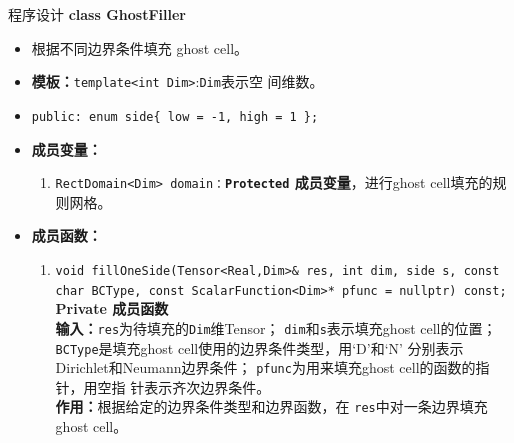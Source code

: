 \documentclass{beamer}
\begin{document}
\begin{frame}{程序设计}
  \textbf{\large class GhostFiller}
  \begin{itemize}
    \item 根据不同边界条件填充 ghost cell。
    \item \textbf{模板：}\texttt{template<int Dim>}:\texttt{Dim}表示空
      间维数。
    \item   \texttt{public: enum side\{
        low = -1,
        high = 1
        \};}
   \item \textbf{成员变量：}
        \begin{enumerate}[(1)]
            \item \texttt{RectDomain<Dim>
                domain：}\textbf{\texttt{Protected}  成员变量}，进行ghost cell填充的规则网格。
        \end{enumerate}
    \item \textbf{成员函数：}
        \begin{enumerate}[(1)]
                \item \texttt{void fillOneSide(Tensor<Real,Dim>\& res, int dim, side s, const char
                BCType, const ScalarFunction<Dim>* pfunc = nullptr) const;}\\
            \textbf{Private 成员函数}\\
            \textbf{输入：}\texttt{res}为待填充的\texttt{Dim}维Tensor；
            \texttt{dim}和\texttt{s}表示填充ghost cell的位置；
            \texttt{BCType}是填充ghost cell使用的边界条件类型，用`D'和`N'
            分别表示Dirichlet和Neumann边界条件；
                \texttt{pfunc}为用来填充ghost cell的函数的指针，用空指
                针表示齐次边界条件。\\
            \textbf{作用：}根据给定的边界条件类型和边界函数，在
            \texttt{res}中对一条边界填充ghost cell。
             \end{enumerate}
           \end{itemize}
         \end{frame}
\end{document}
